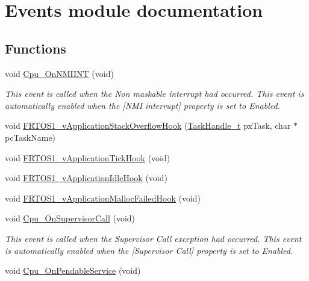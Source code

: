 \hypertarget{group___events__module}{}\section{Events module documentation}
\label{group___events__module}
\subsection*{Functions}
\begin{DoxyCompactItemize}
\item 
void \hyperlink{group___events__module_ga960d094664356278ac5472d45a6ea2f3}{Cpu\+\_\+\+On\+N\+M\+I\+I\+NT} (void)
\begin{DoxyCompactList}\small\item\em This event is called when the Non maskable interrupt had occurred. This event is automatically enabled when the \mbox{[}N\+MI interrupt\mbox{]} property is set to \textquotesingle{}Enabled\textquotesingle{}. \end{DoxyCompactList}\item 
void \hyperlink{group___events__module_ga1e81c467b899cd40c827a5243d259dee}{F\+R\+T\+O\+S1\+\_\+v\+Application\+Stack\+Overflow\+Hook} (\hyperlink{task_8h_ae95f44d4cfeb4a599c6cc258d241cb6b}{Task\+Handle\+\_\+t} px\+Task, char $\ast$pc\+Task\+Name)
\item 
void \hyperlink{group___events__module_gaf8fe6769cea9aeb943962871b26b203b}{F\+R\+T\+O\+S1\+\_\+v\+Application\+Tick\+Hook} (void)
\item 
void \hyperlink{group___events__module_ga47ee4f5ef904e733b7690af3ef89a1b0}{F\+R\+T\+O\+S1\+\_\+v\+Application\+Idle\+Hook} (void)
\item 
void \hyperlink{group___events__module_ga83b87d2e8c6b269bbdc03cf06d1164a2}{F\+R\+T\+O\+S1\+\_\+v\+Application\+Malloc\+Failed\+Hook} (void)
\item 
void \hyperlink{group___events__module_ga428b28484a15546393b77d621e3f074d}{Cpu\+\_\+\+On\+Supervisor\+Call} (void)
\begin{DoxyCompactList}\small\item\em This event is called when the Supervisor Call exception had occurred. This event is automatically enabled when the \mbox{[}Supervisor Call\mbox{]} property is set to \textquotesingle{}Enabled\textquotesingle{}. \end{DoxyCompactList}\item 
void \hyperlink{group___events__module_ga8ae22afd184f10ce1e5d0870ef5d602e}{Cpu\+\_\+\+On\+Pendable\+Service} (void)

\end{DoxyCompactItemize}
